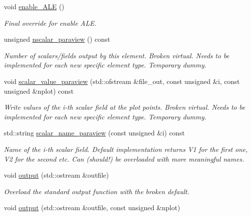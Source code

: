 \begin{DoxyCompactItemize}
void \hyperlink{classoomph_1_1RefineableBuoyantQCrouzeixRaviartElement_a7006ef1edd1ac4a178e38945fae581ee}{enable\+\_\+\+A\+LE} ()
\begin{DoxyCompactList}\small\item\em Final override for enable A\+LE. \end{DoxyCompactList}\item 
unsigned \hyperlink{classoomph_1_1RefineableBuoyantQCrouzeixRaviartElement_a2167093a1902a2ed4c79d45eff457ca8}{nscalar\+\_\+paraview} () const
\begin{DoxyCompactList}\small\item\em Number of scalars/fields output by this element. Broken virtual. Needs to be implemented for each new specific element type. Temporary dummy. \end{DoxyCompactList}\item 
void \hyperlink{classoomph_1_1RefineableBuoyantQCrouzeixRaviartElement_a9a8ee12b27daa327e97fbacc89c341c6}{scalar\+\_\+value\+\_\+paraview} (std\+::ofstream \&file\+\_\+out, const unsigned \&i, const unsigned \&nplot) const
\begin{DoxyCompactList}\small\item\em Write values of the i-\/th scalar field at the plot points. Broken virtual. Needs to be implemented for each new specific element type. Temporary dummy. \end{DoxyCompactList}\item 
std\+::string \hyperlink{classoomph_1_1RefineableBuoyantQCrouzeixRaviartElement_ae9b9687a5a15a0089431ad1b143356e5}{scalar\+\_\+name\+\_\+paraview} (const unsigned \&i) const
\begin{DoxyCompactList}\small\item\em Name of the i-\/th scalar field. Default implementation returns V1 for the first one, V2 for the second etc. Can (should!) be overloaded with more meaningful names. \end{DoxyCompactList}\item 
void \hyperlink{classoomph_1_1RefineableBuoyantQCrouzeixRaviartElement_abbe05b977edbfec7752ed417b90e09fa}{output} (std\+::ostream \&outfile)
\begin{DoxyCompactList}\small\item\em Overload the standard output function with the broken default. \end{DoxyCompactList}\item 
void \hyperlink{classoomph_1_1RefineableBuoyantQCrouzeixRaviartElement_a36bc6dc9052947f0932a605dd4d0e8f0}{output} (std\+::ostream \&outfile, const unsigned \&nplot)

\end{DoxyCompactItemize}
